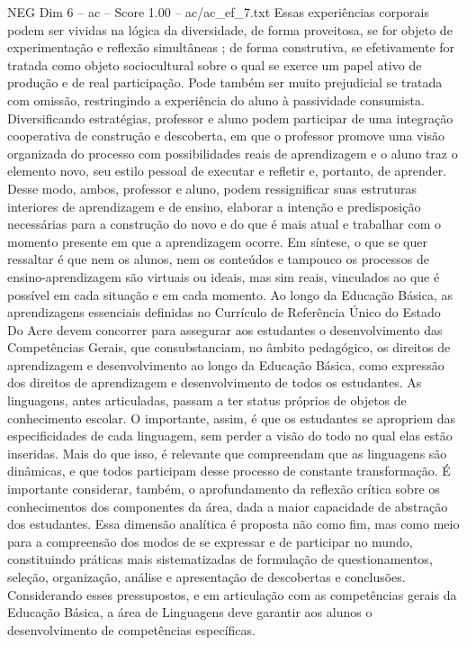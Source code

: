 \begin{textsample}{NEG Dim 6 – ac – Score 1.00 – ac/ac\_ef\_7.txt}
Essas experiências corporais podem ser vividas na lógica da diversidade, de forma proveitosa, se for objeto de experimentação e reflexão simultâneas ; de forma construtiva, se efetivamente for tratada como objeto sociocultural sobre o qual se exerce um papel ativo de produção e de real participação.
Pode também ser muito prejudicial se tratada com omissão, restringindo a experiência do aluno à passividade consumista.
Diversificando estratégias, professor e aluno podem participar de uma integração cooperativa de construção e descoberta, em que o professor promove uma visão organizada do processo com possibilidades reais de aprendizagem e o aluno traz o elemento novo, seu estilo pessoal de executar e refletir e, portanto, de aprender.
Desse modo, ambos, professor e aluno, podem ressignificar suas estruturas interiores de aprendizagem e de ensino, elaborar a intenção e predisposição necessárias para a construção do novo e do que é mais atual e trabalhar com o momento presente em que a aprendizagem ocorre.
Em síntese, o que se quer ressaltar é que nem os alunos, nem os conteúdos e tampouco os processos de ensino-aprendizagem são virtuais ou ideais, mas sim reais, vinculados ao que é possível em cada situação e em cada momento.
Ao longo da Educação Básica, as aprendizagens essenciais definidas no Currículo de Referência Único do Estado Do Acre devem concorrer para assegurar aos estudantes o desenvolvimento das Competências Gerais, que consubstanciam, no âmbito pedagógico, os direitos de aprendizagem e desenvolvimento ao longo da Educação Básica, como expressão dos direitos de aprendizagem e desenvolvimento de todos os estudantes.
As linguagens, antes articuladas, passam a ter status próprios de objetos de conhecimento escolar.
O importante, assim, é que os estudantes se apropriem das especificidades de cada linguagem, sem perder a visão do todo no qual elas estão inseridas.
Mais do que isso, é relevante que compreendam que as linguagens são dinâmicas, e que todos participam desse processo de constante transformação.
É importante considerar, também, o aprofundamento da reflexão crítica sobre os conhecimentos dos componentes da área, dada a maior capacidade de abstração dos estudantes.
Essa dimensão analítica é proposta não como fim, mas como meio para a compreensão dos modos de se expressar e de participar no mundo, constituindo práticas mais sistematizadas de formulação de questionamentos, seleção, organização, análise e apresentação de descobertas e conclusões.
Considerando esses pressupostos, e em articulação com as competências gerais da Educação Básica, a área de Linguagens deve garantir aos alunos o desenvolvimento de competências específicas.

\end{textsample}
